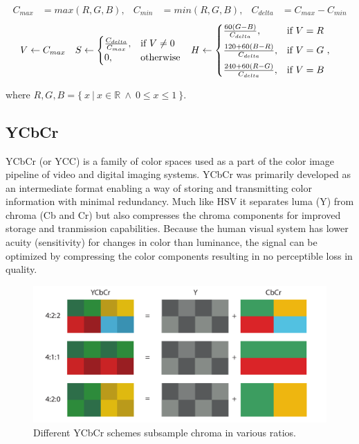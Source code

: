 \documentclass[thesis.tex]{subfiles}
\begin{document}
\begin{align*}
C_{max}&=max(R, G, B),	&	C_{min}&=min(R, G, B),	&	C_{delta}&=C_{max}-C_{min}
\end{align*}
\begin{align*}
V &\leftarrow C_{max}	&
S &\leftarrow
	\begin{cases}
		\frac{C_{delta}}{C_{max}}, & \text{if $V\neq0$}\\
		0, & \text{otherwise}
	\end{cases}			&
H &\leftarrow
	\begin{cases}
		\frac{60(G-B)}{C_{delta}}, & \text{if $V=R$}\vspace{2mm}\\
		\frac{120+60(B-R)}{C_{delta}}, & \text{if $V=G$}\vspace{2mm}\\
		\frac{240+60(R-G)}{C_{delta}}, & \text{if $V=B$}
	\end{cases},
\end{align*}

\noindent where $R, G, B = \{\ x\ \vert\ x \in \mathbb R\ \wedge\ 0 \leq x \leq 1\ \}$.

\subsection{YCbCr}
YCbCr (or YCC) is a family of color spaces used as a part of the color image pipeline of video and digital imaging systems. YCbCr was primarily developed as an intermediate format enabling a way of storing and transmitting color information with minimal redundancy. Much like HSV it separates luma (Y) from chroma (Cb and Cr) but also compresses the chroma components for improved storage and tranmission capabilities. Because the human visual system has lower acuity (sensitivity) for changes in color than luminance, the signal can be optimized by compressing the color components resulting in no perceptible loss in quality. \cite{color_vision}

\begin{figure}[ht]
\centering \includegraphics[width=\textwidth]{images/ycbcr}
\caption{Different YCbCr schemes subsample chroma in various ratios.\label{figure:ycbcr}}
\end{figure}
\end{document}
